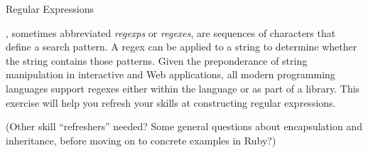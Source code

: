 \begin{chips}{Regular Expressions}

    , sometimes abbreviated \emph{regexps} or
    \emph{regexes}, are sequences of characters that define a search
    pattern.  A regex can be applied to a string to determine whether
    the string contains those patterns.  Given the preponderance of
    string manipulation in interactive and Web applications, all modern
    programming languages support regexes either within the language or
    as part of a library.  This exercise will help you refresh your
    skills at constructing regular expressions.

    (Other skill ``refreshers'' needed?  Some general questions about
    encapsulation and inheritance, before moving on to concrete examples
    in Ruby?)

\end{chips}